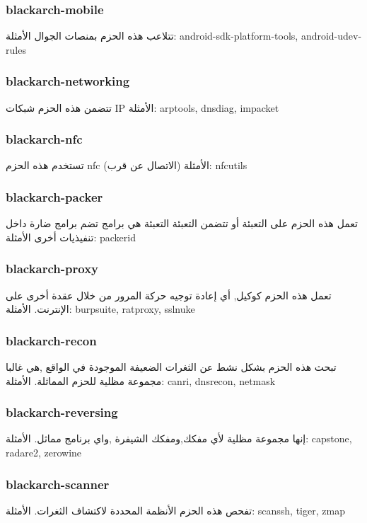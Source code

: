 \documentclass[a4paper, oneside, 11pt]{book}
\begin{document}
\subsubsection{blackarch-mobile}
تتلاعب هذه الحزم بمنصات الجوال
الأمثلة: android-sdk-platform-tools, android-udev-rules

\subsubsection{blackarch-networking}
تتضمن هذه الحزم شبكات IP 
الأمثلة: arptools, dnsdiag, impacket

\subsubsection{blackarch-nfc}
تستخدم هذه الحزم nfc (الاتصال عن قرب)
الأمثلة: nfcutils


\subsubsection{blackarch-packer}
تعمل هذه الحزم على التعبئة أو تتضمن التعبئة
التعبئة هي برامج تضم برامج ضارة داخل تنفيذيات أخرى
الأمثلة: packerid


\subsubsection{blackarch-proxy}
تعمل هذه الحزم كوكيل, أي إعادة توجيه حركة المرور من خلال عقدة أخرى على الإنترنت.
الأمثلة: burpsuite, ratproxy, sslnuke


\subsubsection{blackarch-recon}
تبحث هذه الحزم بشكل نشط عن الثغرات الضعيفة الموجودة في الواقع ,هي غالبا مجموعة مظلية للحزم المماثلة.
الأمثلة: canri, dnsrecon, netmask


\subsubsection{blackarch-reversing}
إنها مجموعة مظلية لأي مفكك,ومفكك الشيفرة ,واي برنامج مماثل.
الأمثلة: capstone, radare2, zerowine


\subsubsection{blackarch-scanner}
تفحص هذه الحزم  الأنظمة المحددة لاكتشاف الثغرات.
الأمثلة: scanssh, tiger, zmap
\end{document}
